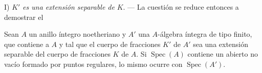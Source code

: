 I) $K'$ \emph{es una extensión separable de} $K$. --- La cuestión se reduce entonces a
demostrar el

\begin{lemma}[6.12.4.1]
\label{IV.2.s6.12.4.1-fr}
Sean $A$ un anillo íntegro noetheriano y $A'$ una $A$-álgebra íntegra de
tipo finito, que contiene a $A$ y tal que el cuerpo de fracciones $K'$ de
$A'$ sea una extensión separable del cuerpo de fracciones $K$ de $A$. Si
$\operatorname{Spec}(A)$ contiene un abierto no vacío formado por puntos
regulares, lo mismo ocurre con $\operatorname{Spec}(A')$.
\end{lemma}
